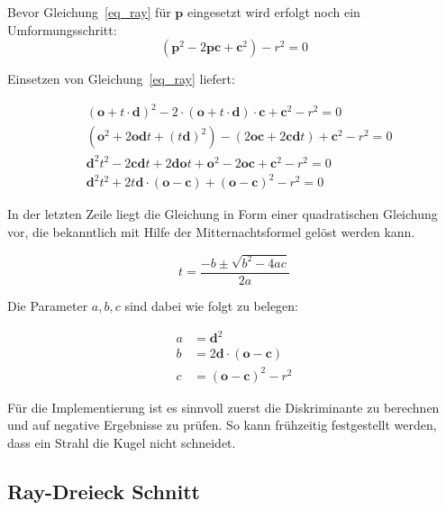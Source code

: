 Bevor Gleichung~\ref{eq_ray} für $\mathbf{p}$ eingesetzt wird erfolgt noch ein Umformungsschritt:
\begin{equation*}
    (\mathbf{p}^2 - 2\mathbf{pc} + \mathbf{c}^2) - \mathit{r}^2 = 0
\end{equation*}

Einsetzen von Gleichung~\ref{eq_ray} liefert:

\begin{align*}
    &(\mathbf{o} + \mathit{t} \cdot \mathbf{d})^2 - 2 \cdot (\mathbf{o} + \mathit{t} \cdot 
      \mathbf{d}) \cdot \mathbf{c} + \mathbf{c}^2 - \mathit{r}^2 = 0\\
    &(\mathbf{o}^2 + 2\mathbf{od}\mathit{t} + (\mathit{t}\mathbf{d})^2) - 
     (2\mathbf{oc} + 2\mathbf{cd}\mathit{t}) + \mathbf{c}^2 - \mathit{r}^2 = 0\\
    &\mathbf{d}^2\mathit{t}^2 - 2\mathbf{cd}\mathit{t} + 2\mathbf{do}\mathit{t} + \mathbf{o}^2 -
     2\mathbf{oc} + \mathbf{c}^2 - \mathit{r}^2 = 0\\
    &\mathbf{d}^2\mathit{t}^2 + 2\mathit{t}\mathbf{d} \cdot (\mathbf{o} - \mathbf{c}) +
     (\mathbf{o} - \mathbf{c})^2 - \mathit{r}^2 = 0
\end{align*}

In der letzten Zeile liegt die Gleichung in Form einer quadratischen Gleichung vor, die bekanntlich
mit Hilfe der Mitternachtsformel gelöst werden kann.

\begin{equation*}
   t = \frac{-b \pm \sqrt{b^2 - 4ac}}{2a} 
\end{equation*}

Die Parameter $\mathit{a, b, c}$ sind dabei wie folgt zu belegen:

\begin{align*}
    a &= \mathbf{d}^2\\
    b &= 2\mathbf{d} \cdot (\mathbf{o} - \mathbf{c})\\
    c &= (\mathbf{o} - \mathbf{c})^2 - \mathit{r}^2
\end{align*}

Für die Implementierung ist es sinnvoll zuerst die Diskriminante zu berechnen und
auf negative Ergebnisse zu prüfen. So kann frühzeitig festgestellt werden, dass
ein Strahl die Kugel nicht schneidet.

\subsection{Ray-Dreieck Schnitt}

